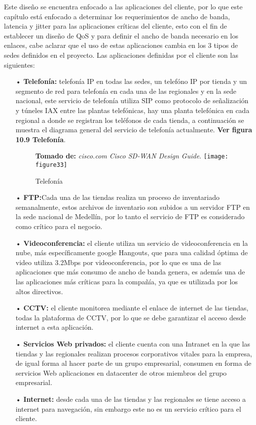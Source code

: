Este diseño se encuentra enfocado a las aplicaciones del cliente, por lo que este capítulo está enfocado a determinar los requerimientos de ancho de banda, latencia y jitter para las aplicaciones críticas del cliente, esto con el fin de establecer un diseño de QoS y para definir el ancho de banda necesario en los enlaces, cabe aclarar que el uso de estas aplicaciones cambia en los 3 tipos de sedes definidos en el proyecto. Las aplicaciones definidas por el cliente son las siguientes:
\begin{itemize}
\item[•]\textbf{Telefonía:} telefonía IP en todas las sedes, un telefóno IP por tienda y un segmento de red para telefonía en cada una de las regionales y en la sede nacional, este servicio de telefonía utiliza SIP como protocolo de señalización y túneles IAX entre las plantas telefónicas, hay una planta telefónica en cada regional a donde se registran los teléfonos de cada tienda, a continuación se muestra el diagrama general del servicio de telefonía actualmente. \textbf{Ver figura 10.9 Telefonía}.
\begin{figure}[htbp]
 \textbf{Tomado de:} \textit{cisco.com Cisco SD-WAN Design Guide}.
  \centering
    {\texttt{[image: figure33]}}%
  \caption{Telefonía}
  \label{fig:fig2subfig}
\end{figure}

\item[•]\textbf{FTP:}Cada una de las tiendas realiza un proceso de inventariado semanalmente, estos archivos de inventario son subidos a un servidor FTP en la sede nacional de Medellín, por lo tanto el servicio de FTP es considerado como crítico para el negocio.
\item[•]\textbf{Videoconferencia:} el cliente utiliza un servicio de videoconferencia en la nube, más específicamente google Hangouts, que para una calidad óptima de video utiliza 3.2Mbps por videoconferencia, por lo que es una de las aplicaciones que más consumo de ancho de banda genera, es además una de las aplicaciones más críticas para la compañía, ya que es utilizada por los altos directivos.
\item[•]\textbf{CCTV:} el cliente monitorea mediante el enlace de internet de las tiendas, todas la plataforma de CCTV, por lo que se debe garantizar el acceso desde internet a esta aplicación.
\item[•]\textbf{Servicios Web privados:} el cliente cuenta con una Intranet en la que las tiendas y las regionales realizan procesos corporativos vitales para la empresa, de igual forma al hacer parte de un grupo empresarial, consumen en forma de servicios Web aplicaciones en datacenter de otros miembros del grupo empresarial.
\item[•]\textbf{Internet:} desde cada una de las tiendas y las regionales se tiene acceso a internet para navegación, sin embargo este no es un servicio crítico para el cliente.


\end{itemize}
